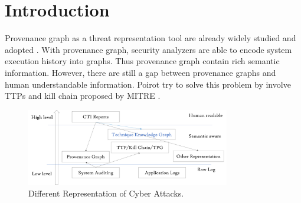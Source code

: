 \section{Introduction}
\label{sec:introduction}

Provenance graph as a threat representation tool are already widely studied and adopted \cite{li2021}. With provenance graph, security analyzers are able to encode system execution history into graphs. Thus provenance graph contain rich semantic information. However, there are still a gap between provenance graphs and human understandable information. Poirot \cite{Milajerdi2019} try to solve this problem by involve TTPs and kill chain proposed by MITRE \cite{}.

\begin{figure}
    \centering
    \includegraphics[width=3.5in]{Image/representation.png}
    \caption{Different Representation of Cyber Attacks.}
    \label{fig:representation}
\end{figure}

